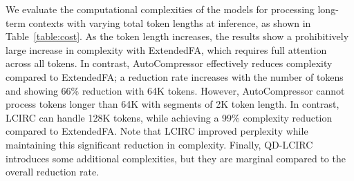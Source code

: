 We evaluate the computational complexities of the models for processing long-term contexts with varying total token lengths at inference, as shown in Table~\ref{table:cost}. 
As the token length increases, the results show a prohibitively large increase in complexity with ExtendedFA, which requires full attention across all tokens.
In contrast, AutoCompressor effectively reduces complexity compared to ExtendedFA; 
a reduction rate increases with the number of tokens and showing 66\% reduction with 64K tokens. 
However, AutoCompressor cannot process tokens longer than 64K with segments of 2K token length.
In contrast, LCIRC can handle 128K tokens, while achieving a 99\% complexity reduction compared to ExtendedFA. 
Note that LCIRC improved perplexity while maintaining this significant reduction in complexity.
Finally, QD-LCIRC introduces some additional complexities, but they are marginal compared to the overall reduction rate.




